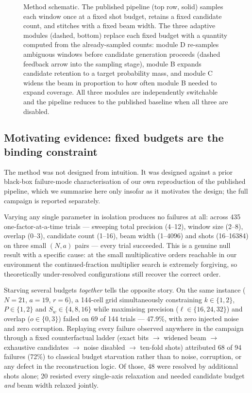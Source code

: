 \documentclass[preprint,11pt]{elsarticle}
\begin{document}
\begin{figure}[htbp]
{%
}
\caption{Method schematic. The published pipeline (top row, solid) samples
each window once at a fixed shot budget, retains a fixed candidate count,
and stitches with a fixed beam width. The three adaptive modules
(dashed, bottom) replace each fixed budget with a quantity computed from
the already-sampled counts: module D re-samples ambiguous windows before
candidate generation proceeds (dashed feedback arrow into the sampling
stage), module B expands candidate retention to a target probability
mass, and module C widens the beam in proportion to how often module B
needed to expand coverage. All three modules are independently
switchable and the pipeline reduces to the published baseline when all
three are disabled.}
\label{fig:schematic}
\end{figure}



\subsection{Motivating evidence: fixed budgets are the binding constraint}
\label{sec:motivation}

The method was not designed from intuition. It was designed against a
prior black-box failure-mode characterisation of our own reproduction of
the published pipeline, which we summarise here only insofar as it
motivates the design; the full campaign is reported separately.

Varying any single parameter in isolation produces no failures at all:
across 435 one-factor-at-a-time trials --- sweeping total precision
(4--12), window size (2--8), overlap (0--3), candidate count (1--16),
beam width (1--4096) and shots (16--16384) on three small $(N,a)$ pairs
--- every trial succeeded. This is a genuine null result with a specific
cause: at the small multiplicative orders reachable in our environment
the continued-fraction multiplier search is extremely forgiving, so
theoretically under-resolved configurations still recover the correct
order.

Starving several budgets \emph{together} tells the opposite story. On the
same instance ($N=21$, $a=19$, $r=6$), a 144-cell grid simultaneously
constraining $k\in\{1,2\}$, $P\in\{1,2\}$ and $S_w\in\{4,8,16\}$ while
maximising precision ($\ell\in\{16,24,32\}$) and overlap ($o\in\{0,3\}$)
failed on 69 of 144 trials --- 47.9\%, with zero injected noise and zero
corruption. Replaying every failure observed anywhere in the campaign
through a fixed counterfactual ladder (exact bits $\to$ widened beam
$\to$ exhaustive candidates $\to$ noise disabled $\to$ ten-fold shots)
attributed 68 of 94 failures (72\%) to classical budget starvation rather
than to noise, corruption, or any defect in the reconstruction logic. Of
those, 48 were resolved by additional shots alone; 20 resisted every
single-axis relaxation and needed candidate budget \emph{and} beam width
relaxed jointly.
\end{document}
